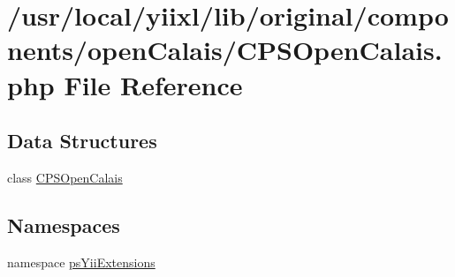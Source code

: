 \hypertarget{CPSOpenCalais_8php}{
\section{/usr/local/yiixl/lib/original/components/openCalais/CPSOpenCalais.php File Reference}
\label{CPSOpenCalais_8php}
}
\subsection*{Data Structures}
\begin{DoxyCompactItemize}
\item 
class \hyperlink{classCPSOpenCalais}{CPSOpenCalais}
\end{DoxyCompactItemize}
\subsection*{Namespaces}
\begin{DoxyCompactItemize}
\item 
namespace \hyperlink{namespacepsYiiExtensions}{psYiiExtensions}
\end{DoxyCompactItemize}
